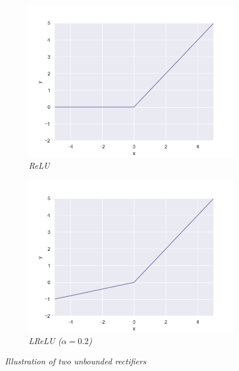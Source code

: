 \documentclass{article}
\begin{document}
            \begin{figure}[!ht]
                \begin{subfigure}{.49\linewidth}
                    \centering
                    \includegraphics[width=.9\linewidth]{pics/act-relu.png}
                    \caption{\textit{ReLU}}
                    \label{fig:relu}
                \end{subfigure}
                \begin{subfigure}{.49\linewidth}
                    \centering
                    \includegraphics[width=.9\linewidth]{pics/act-lrelu.png}
                    \caption{\textit{LReLU ($\alpha=0.2$)}}
                    \label{fig:lrelu}
                \end{subfigure}
                \caption{\textit{Illustration of two unbounded rectifiers}}
            \end{figure}
\end{document}
